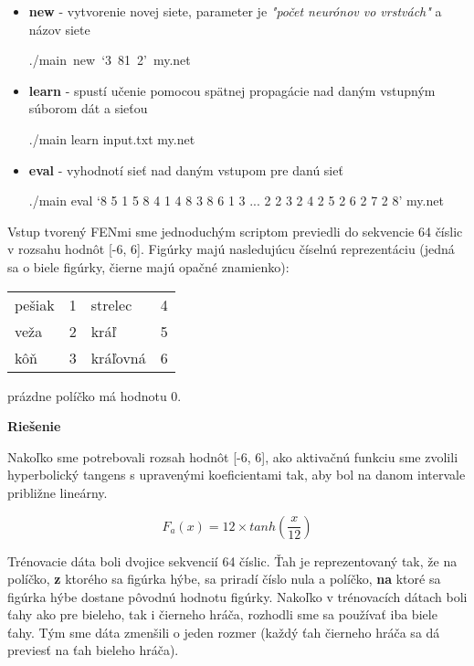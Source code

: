 \documentclass[12pt]{article}
\newcommand{\mysmallsection}[1]{\vspace{0.5cm}{\centering\large\textbf{#1}\\}\normalsize\vspace{0.5cm}}
\begin{document}
\begin{itemize}
\item \textbf{new} - vytvorenie novej siete, parameter je \textit{"počet neurónov vo vrstvách"} a názov siete

{\centering\small ./main~new~`3~81~2'~my.net\\}

\item \textbf{learn} - spustí učenie pomocou spätnej propagácie nad daným vstupným súborom dát a sieťou

{\centering\small ./main learn input.txt my.net \\}

\item \textbf{eval} - vyhodnotí sieť nad daným vstupom pre danú sieť

{\centering\small ./main eval `8 5 1 5 8 4 1 4 8 3 8 6 1 3 ... 2 2 3 2 4 2 5 2 6 2 7 2 8' my.net \\}

\end{itemize}

\mysmallsection{Prístup 1}

Vstup tvorený FENmi sme jednoduchým scriptom previedli do sekvencie 64 číslic v rozsahu hodnôt [-6, 6]. Figúrky majú nasledujúcu číselnú reprezentáciu (jedná sa o biele figúrky, čierne majú opačné znamienko):

\begin{center}
{\small
\hspace*{-1cm}\begin{tabular}{| l l | l l |}
\hline
 pešiak & 1 & strelec & 4 \\
 veža & 2 & kráľ & 5 \\
 kôň & 3 & kráľovná & 6\\
\hline
\end{tabular}
}
\end{center}

prázdne políčko má hodnotu 0.

{\centering\textbf{Riešenie}\\}

Nakoľko sme potrebovali rozsah hodnôt [-6, 6], ako aktivačnú funkciu sme zvolili hyperbolický tangens s upravenými koeficientami tak, aby bol na danom intervale približne lineárny. 

\begin{equation}
F_a(x)=12 \times tanh(\frac{x}{12})
\end{equation}

Trénovacie dáta boli dvojice sekvencií 64 číslic. Ťah je reprezentovaný tak, že na políčko, \textbf{z} ktorého sa figúrka hýbe, sa priradí číslo nula a políčko, \textbf{na} ktoré sa figúrka hýbe dostane pôvodnú hodnotu figúrky. Nakoľko v trénovacích dátach boli ťahy ako pre bieleho, tak i čierneho hráča, rozhodli sme sa používať iba biele ťahy. Tým sme dáta zmenšili o jeden rozmer (každý ťah čierneho hráča sa dá previesť na ťah bieleho hráča).
\end{document}
